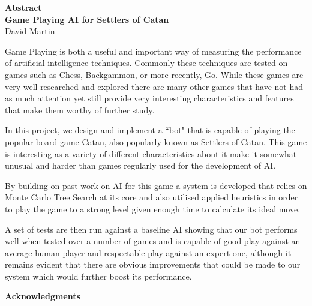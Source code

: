 \documentclass[]{article}
\newcommand\blankpage{%
    \null
    \thispagestyle{empty}%
    \addtocounter{page}{-1}%
    \newpage}
\newenvironment{changemargin}[2]{%
\begin{list}{}{%
\setlength{\topsep}{0pt}%
\setlength{\leftmargin}{#1}%
\setlength{\rightmargin}{#2}%
\setlength{\listparindent}{\parindent}%
\setlength{\itemindent}{\parindent}%
\setlength{\parsep}{\parskip}%
}%
\item[]}{\end{list}}
\begin{document}
\blankpage

\thispagestyle{plain}
\begin{center}
    \huge
    \textbf{Abstract}
    \\
    \large
    \vspace{1.0cm}
    \textbf{Game Playing AI for Settlers of Catan}   
    \vspace{0.2cm}
    \\
    David Martin
    \vspace{0.1cm}
    \\ 
    \noindent\makebox[\linewidth]{\rule{\textwidth}{1pt}} 
\end{center}


\begin{changemargin}{1.8cm}{1.8cm}
 Game Playing is both a useful and important way of measuring the performance of artificial intelligence techniques. Commonly these techniques are tested on games such as Chess, Backgammon, or more recently, Go. While these games are very well researched and explored there are many other games that have not had as much attention yet still provide very interesting characteristics and 
 features that make them worthy of further study.
 
 In this project, we design and implement a ``bot" that is capable of playing the popular board game Catan, also popularly known as Settlers of Catan. This game is interesting as a variety of different characteristics about it make it somewhat unusual and harder than games regularly used for the development of AI.
 
 By building on past work on AI for this game a system is developed that relies on Monte Carlo Tree Search at its core and also utilised applied heuristics in order to play the game to a strong level given enough time to calculate its ideal move.
 
 A set of tests are then run against a baseline AI showing that our bot performs well when tested over a number of games and is capable of good play against an average human player and respectable play against an expert one, although it remains evident that there are obvious improvements that could be made to our system which would further boost its performance.
\end{changemargin}


\pagebreak

\thispagestyle{plain}
\begin{center}
    \huge
    \textbf{Acknowledgments}
    \\
    \large
    \vspace{0.5cm}
    \noindent\makebox[\linewidth]{\rule{\textwidth}{1pt}} 
\end{center}
\end{document}
